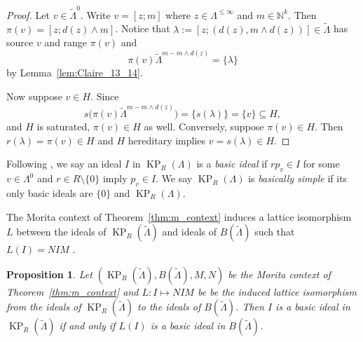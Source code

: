 \documentclass[a4paper,12pt]{amsart}
\numberwithin{equation}{section}
\newtheorem{prop}[thm]{Proposition}
\theoremstyle{definition}
\theoremstyle{remark}
\begin{document}
\begin{proof}
Let $v \in {\tilde{\Lambda}}^0$.  Write  
$v = [z;m]$ where $z \in \Lambda^{\leq \infty}$ and
$m \in {\mathbb{N}}^k$.  Then $\pi(v)=[z;d(z) \wedge m]$. 
Notice that $\lambda := [z; (d(z),m \wedge d(z))] \in {\tilde{\Lambda}}$ has source $v$ and range $\pi(v)$
and  \[\pi(v){\tilde{\Lambda}}^{m-m\wedge d(z)} = \{\lambda\}\] by
Lemma~\ref{lem:Claire_13_14}.

Now suppose $v \in H$.    Since \[
                  s\big(\pi(v){\tilde{\Lambda}}^{m-m\wedge d(z)}\big) = \{s(\lambda)\} = \{v\} \subseteq H,
                 \]
and $H$ is saturated, $\pi(v) \in H$ as well.
Conversely, suppose $\pi(v) \in H$.  Then $r(\lambda) = \pi(v)\in H$
and  $H$  hereditary implies $v=s(\lambda) \in H$.
\end{proof}

Following \cite{T}, we say an ideal $I$ in $\operatorname{KP}_R(\Lambda)$ is a \emph{basic ideal} if  $rp_v \in I$ for some $v\in\Lambda^0$ and $r \in R\setminus\{0\}$   
imply $p_v \in I$.
We say $\operatorname{KP}_R(\Lambda)$ is \emph{basically simple} if its only basic ideals are $\{0\}$ and $\operatorname{KP}_R(\Lambda)$.

The Morita context of Theorem~\ref{thm:m_context} induces a lattice isomorphism $L$ between the ideals
of $\operatorname{KP}_R({\tilde{\Lambda}})$ and ideals of $B({\tilde{\Lambda}})$  such that $L(I)=NIM$ \cite[Proposition~3.5]{GS}.  

\begin{prop}
\label{prop:basicideals} Let $(\operatorname{KP}_R({\tilde{\Lambda}}),B({\tilde{\Lambda}}),M,N)$ be the Morita context 
 of Theorem~\ref{thm:m_context} and $L:I\mapsto NIM$ be 
be the induced lattice isomorphism from the ideals of $\operatorname{KP}_R({\tilde{\Lambda}})$ to the ideals of 
$B(\tilde\Lambda)$.  
Then $I$ is a basic ideal in $\operatorname{KP}_R({\tilde{\Lambda}})$ if and only if $L(I)$ is a basic ideal in $B({\tilde{\Lambda}})$.
\end{prop}
\end{document}
